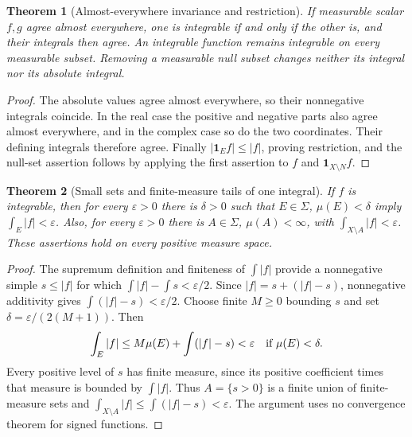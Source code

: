 \documentclass[11pt,oneside,openany]{book}
\newtheorem{theorem}{Theorem}[chapter]
\theoremstyle{definition}
\theoremstyle{remark}
\newcommand{\eps}{\varepsilon}\newcommand{\ee}{\varepsilon}
\newcommand{\one}{\mathbf1}\newcommand{\ind}[1]{\mathbf1_{#1}}
\newcommand{\family}[1]{}
\begin{document}
\begin{theorem}[Almost-everywhere invariance and restriction]
\family{D11.06.scalar_ae_invariance}\label{d11:06:scalar-ae-invariance}
If measurable scalar $f,g$ agree almost everywhere, one is integrable if
and only if the other is, and their integrals then agree. An integrable
function remains integrable on every measurable subset. Removing a
measurable null subset changes neither its integral nor its absolute integral.
\end{theorem}
\begin{proof}
The absolute values agree almost everywhere, so their nonnegative
integrals coincide. In the real case the positive and negative parts also
agree almost everywhere, and in the complex case so do the two
coordinates. Their defining integrals therefore agree. Finally
$|\one_Ef|\leq|f|$, proving restriction, and the null-set assertion follows
by applying the first assertion to $f$ and $\one_{X\setminus N}f$.
\end{proof}

\begin{theorem}[Small sets and finite-measure tails of one integral]
\family{D11.06.absolute_continuity_integral}\label{d11:06:absolute-continuity-integral}
If $f$ is integrable, then for every $\eps>0$ there is $\delta>0$ such
that $E\in\Sigma$, $\mu(E)<\delta$ imply $\int_E|f|<\eps$.
Also, for every $\eps>0$ there is $A\in\Sigma$, $\mu(A)<\infty$, with
$\int_{X\setminus A}|f|<\eps$. These assertions hold on every positive
measure space.
\end{theorem}
\begin{proof}
The supremum definition and finiteness of $\int|f|$ provide a nonnegative
simple $s\leq|f|$ for which
$\int|f|-\int s<\eps/2$. Since $|f|=s+(|f|-s)$, nonnegative additivity
gives $\int(|f|-s)<\eps/2$. Choose finite $M\geq0$ bounding $s$ and set
$\delta=\eps/(2(M+1))$. Then
\[
 \int_E|f|\leq M\mu(E)+\int(|f|-s)<\eps
 \quad\hbox{if }\mu(E)<\delta.
\]
Every positive level of $s$ has finite measure, since its positive
coefficient times that measure is bounded by $\int|f|$. Thus
$A=\{s>0\}$ is a finite union of finite-measure sets and
$\int_{X\setminus A}|f|\leq\int(|f|-s)<\eps$.
The argument uses no convergence theorem for signed functions.
\end{proof}
\end{document}
